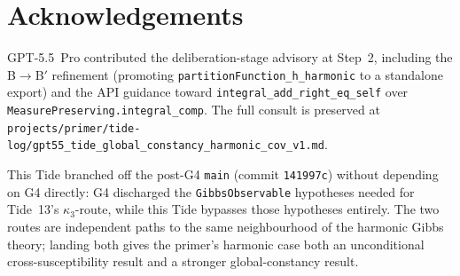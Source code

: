 \documentclass[11pt]{article}
\begin{document}
\section*{Acknowledgements}

GPT-5.5~Pro contributed the deliberation-stage advisory at Step~2,
including the B$\to$B$'$ refinement (promoting
\texttt{partitionFunction\_h\_harmonic} to a standalone export) and
the API guidance toward \texttt{integral\_add\_right\_eq\_self} over
\texttt{MeasurePreserving.integral\_comp}. The full consult is
preserved at
\texttt{projects/primer/tide-log/gpt55\_tide\_global\_constancy\_harmonic\_cov\_v1.md}.

This Tide branched off the post-G4 \texttt{main} (commit
\texttt{141997c}) without depending on G4 directly: G4 discharged the
\texttt{GibbsObservable} hypotheses needed for Tide~13's
$\kappa_3$-route, while this Tide bypasses those hypotheses
entirely. The two routes are independent paths to the same
neighbourhood of the harmonic Gibbs theory; landing both gives the
primer's harmonic case both an unconditional cross-susceptibility
result and a stronger global-constancy result.
\end{document}
